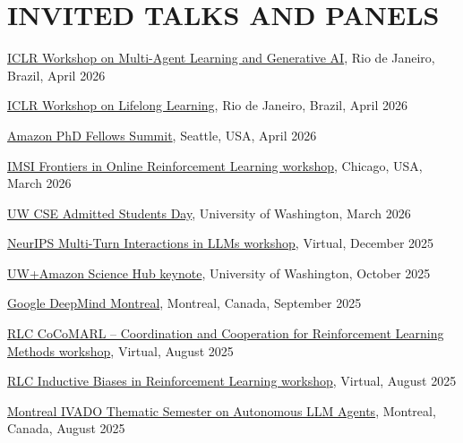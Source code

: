 \documentclass[paper=letter,fontsize=11pt]{scrartcl} %
\newcommand{\NewPart}[2]{\section*{\uppercase{#1} #2}}
\newcommand{\TalkEntry}[4]{
		\noindent \href{#4}{#1}, #2, #3 }
\begin{document}
\NewPart{Invited Talks and Panels}{}
\begin{etaremune}

\item \TalkEntry{ICLR Workshop on Multi-Agent Learning and Generative AI}{Rio de Janeiro, Brazil}{April 2026}{https://iclr26-mal-gai.github.io/}

\item \TalkEntry{ICLR Workshop on Lifelong Learning}{Rio de Janeiro, Brazil}{April 2026}{https://lifelongagent.github.io/}

\item \TalkEntry{Amazon PhD Fellows Summit}{Seattle, USA}{April 2026}{}

\item \TalkEntry{IMSI Frontiers in Online Reinforcement Learning workshop}{Chicago, USA}{March 2026}{https://www.imsi.institute/activities/theoretical-advances-in-reinforcement-learning-and-control/frontiers-in-online-reinforcement-learning/}

\item \TalkEntry{UW CSE Admitted Students Day}{University of Washington}{March 2026}{}

\item \TalkEntry{NeurIPS Multi-Turn Interactions in LLMs workshop}{Virtual}{December 2025}{https://workshop-multi-turn-interaction.github.io/}

\item \TalkEntry{UW+Amazon Science Hub keynote}{University of Washington}{October 2025}{}

\item \TalkEntry{Google DeepMind Montreal}{Montreal, Canada}{September 2025}{}

\item \TalkEntry{RLC CoCoMARL -- Coordination and Cooperation for Reinforcement Learning Methods workshop}{Virtual}{August 2025}{https://sites.google.com/view/cocomarl2025/}

\item \TalkEntry{RLC Inductive Biases in Reinforcement Learning workshop}{Virtual}{August 2025}{https://sites.google.com/view/ibrl-workshop/speakers}

\item \TalkEntry{Montreal IVADO Thematic Semester on Autonomous LLM Agents}{Montreal, Canada}{August 2025}{https://ivado.ca/en/thematic-programs/autonomous-llm-agents-risks-and-scientific-challenges/}


\end{etaremune}
\end{document}
